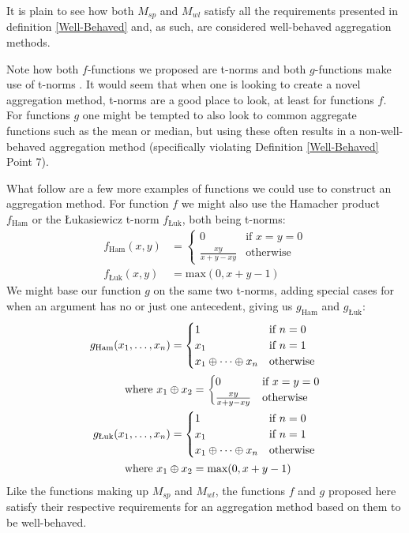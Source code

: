 \documentclass[runningheads]{llncs}
\begin{document}
It is plain to see how both $M_{sp}$ and $M_{wl}$ satisfy all the requirements presented in definition \ref{Well-Behaved} and, as such, are considered well-behaved aggregation methods.

Note how both $f$-functions we proposed are t-norms and both $g$-functions make use of t-norms \cite{DBLP:books/sp/KlementMP00}. It would seem that when one is looking to create a novel aggregation method, t-norms are a good place to look, at least for functions $f$. For functions $g$ one might be tempted to also look to common aggregate functions such as the mean or median, but using these often results in a non-well-behaved aggregation method (specifically violating Definition \ref{Well-Behaved} Point 7).

What follow are a few more examples of functions we could use to construct an aggregation method. For function $f$ we might also use the Hamacher product $f_{\text{Ham}}$ or the Łukasiewicz t-norm $f_{\text{Łuk}}$, both being t-norms:
\begin{align*}
    f_{\text{Ham}}(x,y) &= \begin{cases} 0 &\mbox{if } x=y=0 \\
    \frac{xy}{x+y-xy} & \mbox{otherwise }\end{cases}\\
    f_{\text{Łuk}}(x,y) &= \text{max}(0, x + y - 1)
\end{align*}
We might base our function $g$ on the same two t-norms, adding special cases for when an argument has no or just one antecedent, giving us $g_{\text{Ham}}$ and $g_{\text{Łuk}}$:
\begin{align*}
    g_{\text{Ham}}(x_1, \dots, x_n) \MoveEqLeft= \begin{cases} 1 &\mbox{if } n=0 \\
    x_1 &\mbox{if } n=1 \\
    x_1 \oplus \dots \oplus x_n &\mbox{otherwise }\end{cases}\\
    \text{where } x_1 \oplus x_2 &= \begin{cases} 0 &\mbox{if } x=y=0 \\
    \frac{xy}{x+y-xy} & \mbox{otherwise }\end{cases}\\
    g_{\text{Łuk}}(x_1, \dots, x_n) \MoveEqLeft= \begin{cases} 1 &\mbox{if } n=0 \\
    x_1 &\mbox{if } n=1 \\
    x_1 \oplus \dots \oplus x_n &\mbox{otherwise }\end{cases}\\
    \text{where } x_1 \oplus x_2 &= \text{max}(0, x + y - 1)\\
\end{align*}
Like the functions making up $M_{sp}$ and $M_{wl}$, the functions $f$ and $g$ proposed here satisfy their respective requirements for an aggregation method based on them to be well-behaved.
%
\end{document}
